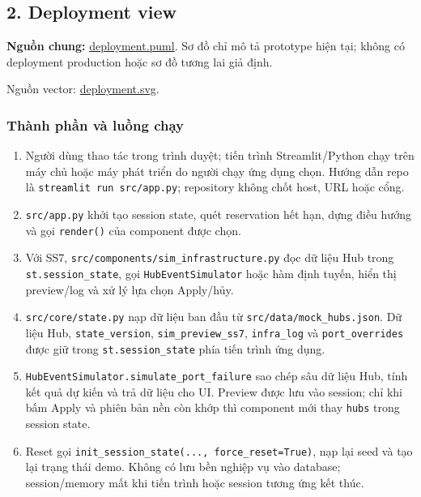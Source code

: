 \documentclass[11pt,a4paper]{article}
\providecommand{\tightlist}{%
  \setlength{\itemsep}{0pt}\setlength{\parskip}{0pt}}
\begin{document}
\hypertarget{deployment-view}{%
\subsection{2. Deployment view}\label{deployment-view}}

\textbf{Nguồn chung:}
\href{../../../diagrams/submission_3/shared/deployment.puml}{deployment.puml}.
Sơ đồ chỉ mô tả prototype hiện tại; không có deployment production hoặc
sơ đồ tương lai giả định.

Nguồn vector:
\href{../../../diagrams/submission_3/shared/deployment.svg}{deployment.svg}.

\hypertarget{thuxe0nh-phux1ea7n-vuxe0-luux1ed3ng-chux1ea1y}{%
\subsubsection{Thành phần và luồng
chạy}\label{thuxe0nh-phux1ea7n-vuxe0-luux1ed3ng-chux1ea1y}}

\begin{enumerate}
\def\labelenumi{\arabic{enumi}.}
\tightlist
\item
  Người dùng thao tác trong trình duyệt; tiến trình Streamlit/Python
  chạy trên máy chủ hoặc máy phát triển do người chạy ứng dụng chọn.
  Hướng dẫn repo là \texttt{streamlit\ run\ src/app.py}; repository
  không chốt host, URL hoặc cổng.
\item
  \texttt{src/app.py} khởi tạo session state, quét reservation hết hạn,
  dựng điều hướng và gọi \texttt{render()} của component được chọn.
\item
  Với SS7, \texttt{src/components/sim\_infrastructure.py} đọc dữ liệu
  Hub trong \texttt{st.session\_state}, gọi \texttt{HubEventSimulator}
  hoặc hàm định tuyến, hiển thị preview/log và xử lý lựa chọn Apply/hủy.
\item
  \texttt{src/core/state.py} nạp dữ liệu ban đầu từ
  \texttt{src/data/mock\_hubs.json}. Dữ liệu Hub,
  \texttt{state\_version}, \texttt{sim\_preview\_ss7},
  \texttt{infra\_log} và \texttt{port\_overrides} được giữ trong
  \texttt{st.session\_state} phía tiến trình ứng dụng.
\item
  \texttt{HubEventSimulator.simulate\_port\_failure} sao chép sâu dữ
  liệu Hub, tính kết quả dự kiến và trả dữ liệu cho UI. Preview được lưu
  vào session; chỉ khi bấm Apply và phiên bản nền còn khớp thì component
  mới thay \texttt{hubs} trong session state.
\item
  Reset gọi \texttt{init\_session\_state(...,\ force\_reset=True)}, nạp
  lại seed và tạo lại trạng thái demo. Không có lưu bền nghiệp vụ vào
  database; session/memory mất khi tiến trình hoặc session tương ứng kết
  thúc.
\end{enumerate}
\end{document}
